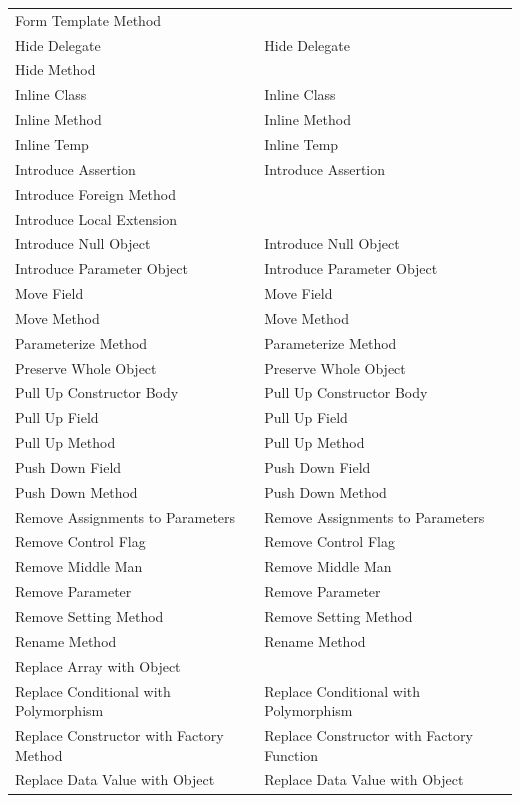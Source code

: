 \documentclass[11pt,a4paper,oneside]{book}
\begin{document}
\begin{longtable}{|p{200pt}|p{200pt}|}
    Form Template Method & \\ 
    Hide Delegate & Hide Delegate\\ 
    Hide Method & \\ 
    Inline Class & Inline Class\\ 
    Inline Method & Inline Method\\ 
    Inline Temp & Inline Temp\\ 
    Introduce Assertion & Introduce Assertion\\ 
    Introduce Foreign Method & \\ 
    Introduce Local Extension & \\ 
    Introduce Null Object & Introduce Null Object\\ 
    Introduce Parameter Object & Introduce Parameter Object\\ 
    Move Field & Move Field\\ 
    Move Method & Move Method\\ 
    Parameterize Method & Parameterize Method\\ 
    Preserve Whole Object & Preserve Whole Object\\ 
    Pull Up Constructor Body & Pull Up Constructor Body\\ 
    Pull Up Field & Pull Up Field\\ 
    Pull Up Method & Pull Up Method\\ 
    Push Down Field & Push Down Field\\ 
    Push Down Method & Push Down Method\\ 
    Remove Assignments to Parameters & Remove Assignments to Parameters \\ 
    Remove Control Flag & Remove Control Flag\\ 
    Remove Middle Man & Remove Middle Man\\ 
    Remove Parameter & Remove Parameter \\ 
    Remove Setting Method & Remove Setting Method\\ 
    Rename Method & Rename Method\\ 
    Replace Array with Object & \\ 
    Replace Conditional with Polymorphism & Replace Conditional with Polymorphism\\ 
    Replace Constructor with Factory Method & Replace Constructor with Factory Function\\ 
    Replace Data Value with Object & Replace Data Value with Object\\ 

\end{longtable}
\end{document}
